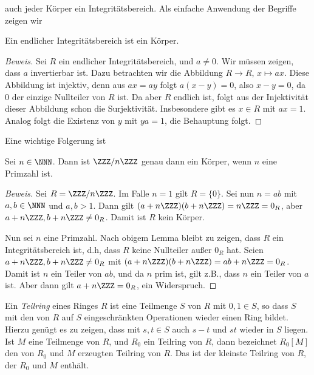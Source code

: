 \documentclass[12pt,a4paper,twoside]{article}
\newcommand{\ei}[1]{\emph{#1}\index{#1}}
\begin{document}
auch jeder K\"orper ein Integrit\"atsbereich.
Als einfache Anwendung der Begriffe zeigen wir
\begin{Lemma}
  Ein endlicher Integrit\"atsbereich ist ein K\"orper.
\end{Lemma}
\begin{proof}[Beweis]
  Sei $R$ ein endlicher Integrit\"atsbereich, und $a\ne0$. Wir m\"ussen
  zeigen, dass $a$ invertierbar ist. Dazu betrachten wir die Abbildung $R\to
  R$, $x\mapsto ax$. Diese Abbildung ist injektiv, denn aus $ax=ay$ folgt
  $a(x-y)=0$, also $x-y=0$, da $0$ der einzige Nullteiler von $R$ ist.  Da
  aber $R$ endlich ist, folgt aus der Injektivit\"at dieser Abbildung schon
  die Surjektivit\"at. Insbesondere gibt es $x\in R$ mit $ax=1$. Analog folgt
  die Existenz von $y$ mit $ya=1$, die Behauptung folgt.
\end{proof}
Eine wichtige Folgerung ist
\begin{Korollar}\label{K:ZnZ}
  Sei $n\in\NNN$. Dann ist $\ZZZ/n\ZZZ$ genau dann ein K\"orper, wenn $n$ eine
  Primzahl ist.
\end{Korollar}
\begin{proof}[Beweis]
  Sei $R=\ZZZ/n\ZZZ$. Im Falle $n=1$ gilt $R=\{0\}$. Sei nun $n=ab$ mit
  $a,b\in\NNN$ und $a,b>1$. Dann gilt $(a+n\ZZZ)(b+n\ZZZ)=n\ZZZ=0_R$, aber
  $a+n\ZZZ,b+n\ZZZ\ne0_R$. Damit ist $R$ kein K\"orper.
  
  Nun sei $n$ eine Primzahl. Nach obigem Lemma bleibt zu zeigen, dass $R$ ein
  Integrit\"atsbereich ist, d.h, dass $R$ keine Nullteiler au\ss er $0_R$ hat.
  Seien $a+n\ZZZ,b+n\ZZZ\ne0_R$ mit $(a+n\ZZZ)(b+n\ZZZ)=ab+n\ZZZ=0_R$. Damit
  ist $n$ ein Teiler von $ab$, und da $n$ prim ist, gilt z.B., dass $n$ ein
  Teiler von $a$ ist. Aber dann gilt $a+n\ZZZ=0_R$, ein Widerspruch.
\end{proof}
Ein \ei{Teilring} eines Ringes $R$ ist eine Teilmenge $S$ von $R$ mit $0,1\in
S$, so dass $S$ mit den von $R$ auf $S$ eingeschr\"ankten Operationen wieder
einen Ring bildet. Hierzu gen\"ugt es zu zeigen, dass mit $s,t\in S$ auch
$s-t$ und $st$ wieder in $S$ liegen. Ist $M$ eine Teilmenge von $R$, und $R_0$
ein Teilring von $R$, dann bezeichnet $R_0[M]$ den von $R_0$ und $M$ erzeugten
Teilring von $R$. Das ist der kleinste Teilring von $R$, der $R_0$ und $M$
enth\"alt.
\end{document}
